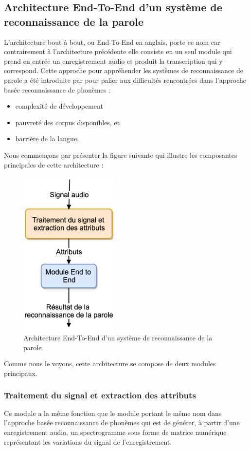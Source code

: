 \subsection{Architecture End-To-End d'un système de reconnaissance de la parole} \label{Archi2}
L'architecture bout à bout, ou End-To-End en anglais, porte ce nom car contrairement à l'architecture précédente elle consiste en un seul module qui prend en entrée un enregistrement audio et produit la transcription qui y correspond. 
Cette approche pour appréhender les systèmes de reconnaissance de parole a été introduite par \cite{towardse2esr} pour palier aux difficultés rencontrées dans l'approche basée reconnaissance de phonèmes :
\begin{itemize}
    \item complexité de développement
    \item pauvreté des corpus disponibles, et 
    \item barrière de la langue. 
\end{itemize}

Nous commençons par présenter la figure suivante qui illustre les composantes principales de cette architecture : 
\begin{figure}[H]
    \centering
    \includegraphics[width=140pt]{images/chap1/E2E_Archi.png}
    \caption{Architecture End-To-End d'un système de reconnaissance de la parole}
\end{figure}

Comme nous le voyons, cette architecture se compose de deux modules principaux.

\subsubsection{Traitement du signal et extraction des attributs}
Ce module a la même fonction que le module portant le même nom dans l'approche basée reconnaissance de phonèmes qui est de générer, à partir d'une enregistrement audio, un spectrogramme sous forme de matrice numérique représentant les variations du signal de l'enregistrement.

